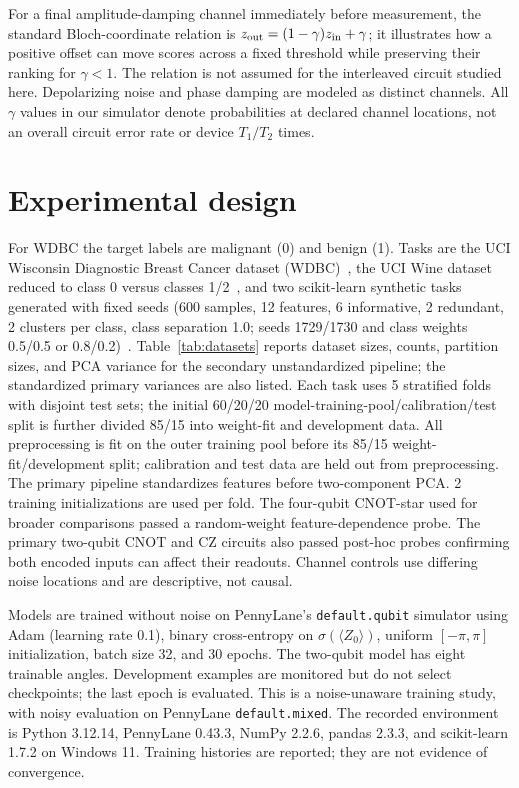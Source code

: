 \documentclass[conference]{IEEEtran}
\begin{document}
For a final amplitude-damping channel immediately before measurement, the standard Bloch-coordinate relation is $z_{\rm out}=(1-\gamma)z_{\rm in}+\gamma$; it illustrates how a positive offset can move scores across a fixed threshold while preserving their ranking for $\gamma<1$. The relation is not assumed for the interleaved circuit studied here. Depolarizing noise and phase damping are modeled as distinct channels. All $\gamma$ values in our simulator denote probabilities at declared channel locations, not an overall circuit error rate or device $T_1/T_2$ times.

\section{Experimental design}
For WDBC the target labels are malignant (0) and benign (1). Tasks are the UCI Wisconsin Diagnostic Breast Cancer dataset (WDBC)~\cite{wdbc}, the UCI Wine dataset reduced to class 0 versus classes 1/2~\cite{wine}, and two scikit-learn synthetic tasks generated with fixed seeds (600 samples, 12 features, 6 informative, 2 redundant, 2 clusters per class, class separation 1.0; seeds 1729/1730 and class weights 0.5/0.5 or 0.8/0.2)~\cite{sklearn}. Table~\ref{tab:datasets} reports dataset sizes, counts, partition sizes, and PCA variance for the secondary unstandardized pipeline; the standardized primary variances are also listed. Each task uses 5 stratified folds with disjoint test sets; the initial 60/20/20 model-training-pool/calibration/test split is further divided 85/15 into weight-fit and development data. All preprocessing is fit on the outer training pool before its 85/15 weight-fit/development split; calibration and test data are held out from preprocessing. The primary pipeline standardizes features before two-component PCA. 2 training initializations are used per fold. The four-qubit CNOT-star used for broader comparisons passed a random-weight feature-dependence probe. The primary two-qubit CNOT and CZ circuits also passed post-hoc probes confirming both encoded inputs can affect their readouts. Channel controls use differing noise locations and are descriptive, not causal.

Models are trained without noise on PennyLane's \texttt{default.qubit} simulator using Adam (learning rate 0.1), binary cross-entropy on $\sigma(\langle Z_0\rangle)$, uniform $[-\pi,\pi]$ initialization, batch size 32, and 30 epochs. The two-qubit model has eight trainable angles. Development examples are monitored but do not select checkpoints; the last epoch is evaluated. This is a noise-unaware training study, with noisy evaluation on PennyLane \texttt{default.mixed}. The recorded environment is Python 3.12.14, PennyLane 0.43.3, NumPy 2.2.6, pandas 2.3.3, and scikit-learn 1.7.2 on Windows 11. Training histories are reported; they are not evidence of convergence.
\end{document}
